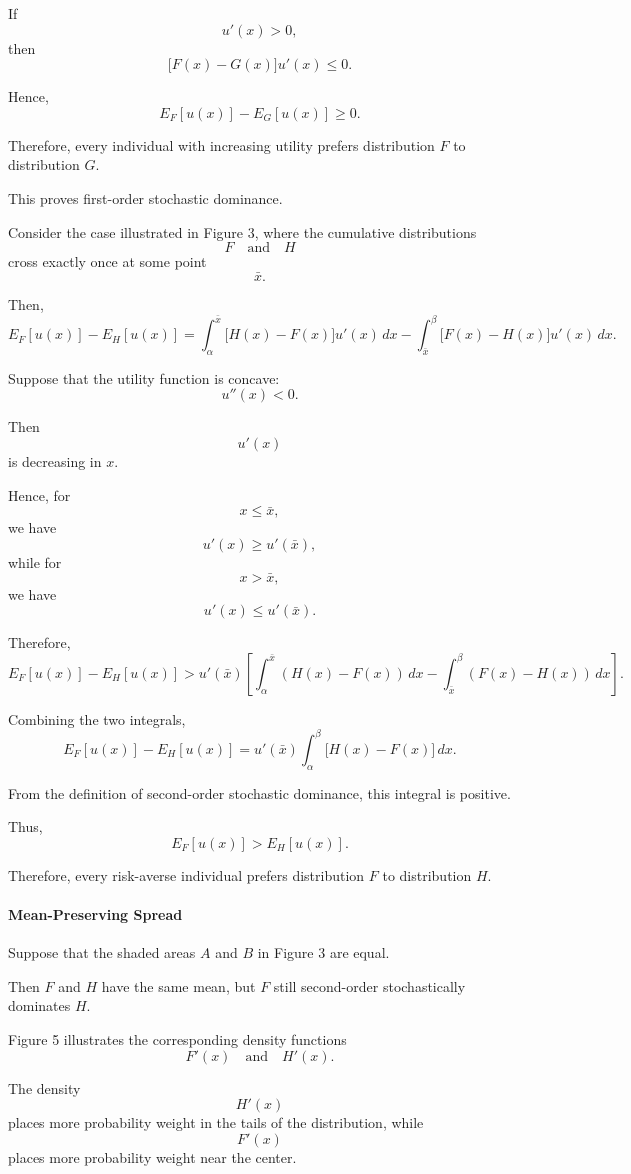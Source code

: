 If
\[
u'(x)>0,
\]
then
\[
\bigl[F(x)-G(x)\bigr]u'(x)\le 0.
\]

Hence,
\[
E_F[u(x)]
-
E_G[u(x)]
\ge 0.
\]

Therefore, every individual with increasing utility prefers distribution \(F\) to distribution \(G\).

This proves first-order stochastic dominance.



Consider the case illustrated in Figure 3, where the cumulative distributions
\[
F
\quad\text{and}\quad
H
\]
cross exactly once at some point
\[
\bar x.
\]

Then,
\[
E_F[u(x)]-E_H[u(x)]
=
\int_{\alpha}^{\bar x}
\bigl[H(x)-F(x)\bigr]u'(x)\,dx
-
\int_{\bar x}^{\beta}
\bigl[F(x)-H(x)\bigr]u'(x)\,dx.
\]

Suppose that the utility function is concave:
\[
u''(x)<0.
\]

Then
\[
u'(x)
\]
is decreasing in \(x\).

Hence, for
\[
x\le \bar x,
\]
we have
\[
u'(x)\ge u'(\bar x),
\]
while for
\[
x>\bar x,
\]
we have
\[
u'(x)\le u'(\bar x).
\]

Therefore,
\[
E_F[u(x)]-E_H[u(x)]
>
u'(\bar x)
\left[
\int_{\alpha}^{\bar x}
(H(x)-F(x))\,dx
-
\int_{\bar x}^{\beta}
(F(x)-H(x))\,dx
\right].
\]

Combining the two integrals,
\[
E_F[u(x)]-E_H[u(x)]
=
u'(\bar x)
\int_{\alpha}^{\beta}
\bigl[H(x)-F(x)\bigr]\,dx.
\]

From the definition of second-order stochastic dominance, this integral is positive.

Thus,
\[
E_F[u(x)]>E_H[u(x)].
\]

Therefore, every risk-averse individual prefers distribution \(F\) to distribution \(H\).

\paragraph{Mean-Preserving Spread}

Suppose that the shaded areas \(A\) and \(B\) in Figure 3 are equal.

Then \(F\) and \(H\) have the same mean, but \(F\) still second-order stochastically dominates \(H\).

Figure 5 illustrates the corresponding density functions
\[
F'(x)
\quad\text{and}\quad
H'(x).
\]

The density
\[
H'(x)
\]
places more probability weight in the tails of the distribution, while
\[
F'(x)
\]
places more probability weight near the center.

